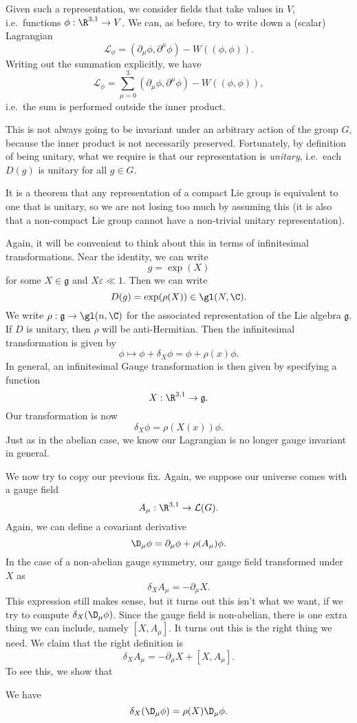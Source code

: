 \documentclass[a4paper]{article}
\begin{document}
Given such a representation, we consider fields that take values in $V$, i.e.\ functions $\phi: \R^{3, 1} \to V$. We can, as before, try to write down a (scalar) Lagrangian
\[
  \mathcal{L}_\phi = (\partial_\mu \phi, \partial^\mu \phi) - W((\phi, \phi)).
\]
Writing out the summation explicitly, we have
\[
  \mathcal{L}_\phi = \sum_{\mu = 0}^3 (\partial_\mu \phi, \partial^\mu \phi) - W((\phi, \phi)),
\]
i.e.\ the sum is performed outside the inner product.

This is not always going to be invariant under an arbitrary action of the group $G$, because the inner product is not necessarily preserved. Fortunately, by definition of being unitary, what we require is that our representation is \emph{unitary}, i.e.\ each $D(g)$ is unitary for all $g \in G$.

It is a theorem that any representation of a compact Lie group is equivalent to one that is unitary, so we are not losing too much by assuming this (it is also that a non-compact Lie group cannot have a non-trivial unitary representation).

Again, it will be convenient to think about this in terms of infinitesimal transformations. Near the identity, we can write
\[
  g = \exp(X)
\]
for some $X \in \mathfrak{g}$ and $X\varepsilon \ll 1$. Then we can write
\[
  D(g) = \exp(\rho(X)) \in \gl(N, \C).
\]
We write $\rho: \mathfrak{g} \to \gl(n, \C)$ for the associated representation of the Lie algebra $\mathfrak{g}$. If $D$ is unitary, then $\rho$ will be anti-Hermitian. Then the infinitesimal transformation is given by
\[
  \phi \mapsto \phi + \delta_X \phi = \phi + \rho(x) \phi.
\]
In general, an infinitesimal Gauge transformation is then given by specifying a function
\[
  X: \R^{3, 1} \to \mathfrak{g}.
\]
Our transformation is now
\[
  \delta_X \phi = \rho(X(x))\phi.
\]
Just as in the abelian case, we know our Lagrangian is no longer gauge invariant in general.

We now try to copy our previous fix. Again, we suppose our universe comes with a gauge field
\[
  A_\mu : \R^{3, 1} \to \mathcal{L}(G).
\]
Again, we can define a covariant derivative
\[
  \D_\mu \phi = \partial_\mu \phi + \rho(A_\mu) \phi.
\]
In the case of a non-abelian gauge symmetry, our gauge field transformed under $X$ as
\[
  \delta_X A_\mu = - \partial_\mu X.
\]
This expression still makes sense, but it turns out this isn't what we want, if we try to compute $\delta_X(\D_\mu \phi)$. Since the gauge field is non-abelian, there is one extra thing we can include, namely $[X, A_\mu]$. It turns out this is the right thing we need. We claim that the right definition is
\[
  \delta_X A_\mu = - \partial_\mu X + [X, A_\mu].
\]
To see this, we show that
\begin{prop}
  We have
  \[
    \delta_X (\D_\mu \phi) = \rho(X) \D_\mu \phi.
  \]
\end{prop}
\end{document}
